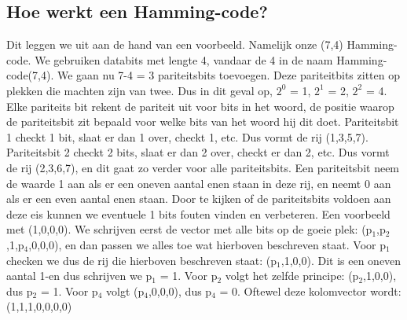 \documentclass[a4paper]{article}
\begin{document}
\subsection{Hoe werkt een Hamming-code?}
Dit leggen we uit aan de hand van een voorbeeld. Namelijk onze (7,4) Hamming-code.
We gebruiken databits met lengte 4, vandaar de 4 in de naam Hamming-code(7,4). We gaan nu 7-4 = 3 pariteitsbits toevoegen. Deze pariteitbits zitten op plekken die machten zijn van twee. Dus in dit geval op, $2^0$ = 1, $2^1$ = 2, $2^2$ = 4. Elke pariteits bit rekent de pariteit uit voor bits in het woord, de positie waarop de pariteitsbit zit bepaald voor welke bits van het woord hij dit doet. Pariteitsbit 1 checkt 1 bit, slaat er dan 1 over, checkt 1, etc. Dus vormt de rij (1,3,5,7). Pariteitsbit 2 checkt 2 bits, slaat er dan 2 over, checkt er dan 2, etc. Dus vormt de rij (2,3,6,7), en dit gaat zo verder voor alle pariteitsbits. Een pariteitsbit neem de waarde 1 aan als er een oneven aantal enen staan in deze rij, en neemt 0 aan als er een even aantal enen staan. Door te kijken of de pariteitsbits voldoen aan deze eis kunnen we eventuele 1 bits fouten vinden en verbeteren. Een voorbeeld met (1,0,0,0). We schrijven eerst de vector met alle bits op de goeie plek: (p$_1$,p$_2$,1,p$_4$,0,0,0), en dan passen we alles toe wat hierboven beschreven staat. Voor p$_1$ checken we dus de rij die hierboven beschreven staat: (p$_1$,1,0,0). Dit is een oneven aantal 1-en dus schrijven we p$_1$ = 1. Voor p$_2$ volgt het zelfde principe: (p$_2$,1,0,0), dus p$_2$ = 1. Voor p$_4$ volgt (p$_4$,0,0,0), dus p$_4$ = 0. Oftewel deze kolomvector wordt: (1,1,1,0,0,0,0)
\end{document}

